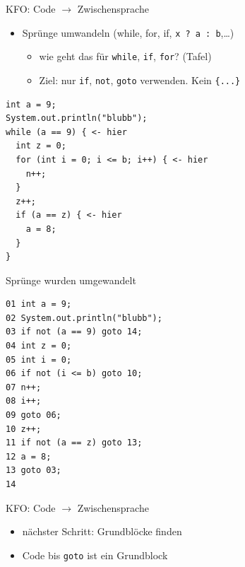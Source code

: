 \documentclass[18pt]{beamer}
\begin{document}
	\begin{frame}[fragile]{KFO: Code $\rightarrow$ Zwischensprache}
	\begin{itemize}
		\item Sprünge umwandeln (while, for, if, \texttt{x ? a : b},\dots)
		\begin{itemize} 
			\item wie geht das für \texttt{while}, \texttt{if}, \texttt{for}? (Tafel)
			\item Ziel: nur \texttt{if}, \texttt{not}, \texttt{goto} verwenden. Kein \texttt{\{...\}}
		\end{itemize}
	\end{itemize}
	\centering
	\begin{verbatim}
int a = 9;
System.out.println("blubb");
while (a == 9) { <- hier
  int z = 0;
  for (int i = 0; i <= b; i++) { <- hier
    n++;
  }
  z++;
  if (a == z) { <- hier
    a = 8;
  }
}
	\end{verbatim}
	\end{frame}

	\begin{frame}[fragile]{Sprünge wurden umgewandelt}
	\begin{verbatim}
01 int a = 9;
02 System.out.println("blubb");
03 if not (a == 9) goto 14;
04 int z = 0;
05 int i = 0;
06 if not (i <= b) goto 10;
07 n++;
08 i++;
09 goto 06;
10 z++;
11 if not (a == z) goto 13;
12 a = 8;
13 goto 03;
14
	\end{verbatim}
	\end{frame}

\begin{frame}{KFO: Code $\rightarrow$ Zwischensprache}
	\begin{itemize}
		\item nächster Schritt: Grundblöcke finden
		\item Code bis \texttt{goto} ist ein Grundblock
	\end{itemize}
\end{frame}
\end{document}
